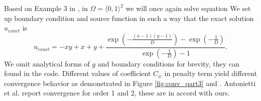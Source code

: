 \begin{example}
\label{ex:quart3}
Based on Example 3 in \cite{Antonietti2013},
in $\Omega = \langle 0, 1 \rangle^2$ we will once again solve equation
We set up boundary condition and source function in such a way that the exact 
solution $u_{exact}$ is
\begin{equation}
	u_{exact} = -xy + x +y + \frac{\exp{\left(-\frac{{\left(x - 1\right)} {\left(y - 
	1\right)}}{D}\right)} - 
	\exp{\left(-\frac{1}{D}\right)}}{\exp{\left(-\frac{1}{D}\right)} 
	- 1}.
\end{equation}
We omit analytical forms of $g$ and boundary conditions for brevity, they can found in 
the code. Different values of coefficient $C_w$ in penalty term yield different 
convergence behavior as demonstrated in Figure \ref{fig:conv_qart3} and 
. Antonietti et al. \cite{Antonietti2013} report convergence 
for order 1 and 2, these are in accord with ours.
\end{example}

